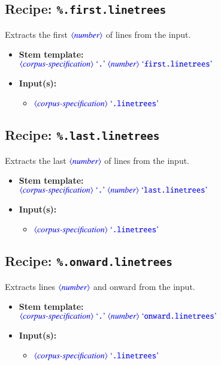 \documentclass[12pt]{report}
\def\blue{\color{blue}}
\begin{document}
\subsection{Recipe: {\blue\tt \%.first.linetrees}}

Extracts the first $\dtype{number}$ of lines from the input.

\begin{itemize}
      \item \textbf{Stem template:}\\
      $\dtype{corpus-specification} \ \dcode{.} \ \dtype{number} \ \dcode{first.linetrees}$
      \item \textbf{Input(s):}
      \begin{itemize}
            \item $\dtype{corpus-specification} \ \dcode{.linetrees}$
      \end{itemize}
\end{itemize}

\subsection{Recipe: {\blue\tt \%.last.linetrees}}

Extracts the last $\dtype{number}$ of lines from the input.

\begin{itemize}
      \item \textbf{Stem template:}\\
      $\dtype{corpus-specification} \ \dcode{.} \ \dtype{number} \ \dcode{last.linetrees}$
      \item \textbf{Input(s):}
      \begin{itemize}
            \item $\dtype{corpus-specification} \ \dcode{.linetrees}$
      \end{itemize}
\end{itemize}

\subsection{Recipe: {\blue\tt \%.onward.linetrees}}

Extracts lines $\dtype{number}$ and onward from the input.

\begin{itemize}
      \item \textbf{Stem template:}\\
      $\dtype{corpus-specification} \ \dcode{.} \ \dtype{number} \ \dcode{onward.linetrees}$
      \item \textbf{Input(s):}
      \begin{itemize}
            \item $\dtype{corpus-specification} \ \dcode{.linetrees}$
      \end{itemize}
\end{itemize}
\end{document}

